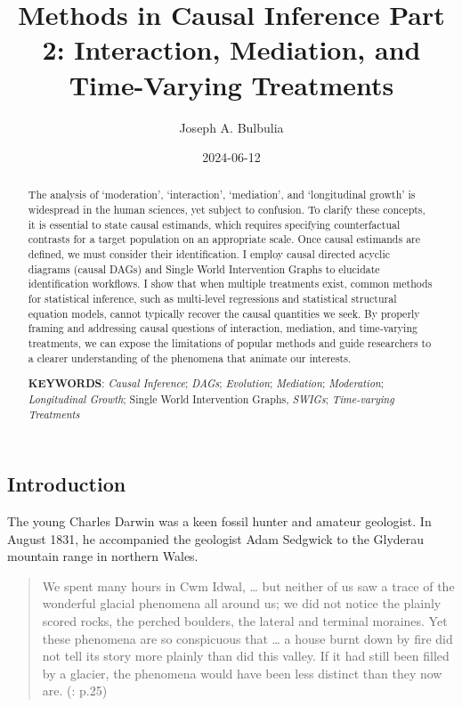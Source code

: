 \documentclass[
  single column]{article}
\title{Methods in Causal Inference Part 2: Interaction, Mediation, and
Time-Varying Treatments}
\author{Joseph A. Bulbulia}
\affil{%
             \small{     Victoria University of Wellington, New Zealand
          ORCID \textcolor[HTML]{A6CE39}{\aiOrcid} ~0000-0002-5861-2056 }
              }
\date{2024-06-12}
\begin{document}
\maketitle
\begin{abstract}
The analysis of `moderation', `interaction', `mediation', and
`longitudinal growth' is widespread in the human sciences, yet subject
to confusion. To clarify these concepts, it is essential to state causal
estimands, which requires specifying counterfactual contrasts for a
target population on an appropriate scale. Once causal estimands are
defined, we must consider their identification. I employ causal directed
acyclic diagrams (causal DAGs) and Single World Intervention Graphs to
elucidate identification workflows. I show that when multiple treatments
exist, common methods for statistical inference, such as multi-level
regressions and statistical structural equation models, cannot typically
recover the causal quantities we seek. By properly framing and
addressing causal questions of interaction, mediation, and time-varying
treatments, we can expose the limitations of popular methods and guide
researchers to a clearer understanding of the phenomena that animate our
interests.

\textbf{KEYWORDS}: \emph{Causal Inference}; \emph{DAGs};
\emph{Evolution}; \emph{Mediation}; \emph{Moderation};
\emph{Longitudinal Growth}; Single World Intervention Graphs,
\emph{SWIGs}; \emph{Time-varying Treatments}
\end{abstract}

\subsection{Introduction}\label{id-introduction}

The young Charles Darwin was a keen fossil hunter and amateur geologist.
In August 1831, he accompanied the geologist Adam Sedgwick to the
Glyderau mountain range in northern Wales.

\begin{quote}
We spent many hours in Cwm Idwal, \ldots{} but neither of us saw a trace
of the wonderful glacial phenomena all around us; we did not notice the
plainly scored rocks, the perched boulders, the lateral and terminal
moraines. Yet these phenomena are so conspicuous that \ldots{} a house
burnt down by fire did not tell its story more plainly than did this
valley. If it had still been filled by a glacier, the phenomena would
have been less distinct than they now are.
(: p.25)
\end{quote}
\end{document}
